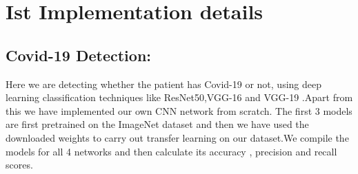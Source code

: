 \documentclass[journal]{IEEEtran}
\begin{document}
\section{Ist Implementation details}
\subsection{Covid-19 Detection:}
\label{PA:DP}
Here we are detecting whether the patient has Covid-19 or not, using deep learning classification techniques like ResNet50,VGG-16 and VGG-19 .Apart from this we have implemented our own CNN network from scratch. The first 3 models are first pretrained on the ImageNet dataset and then we have used the downloaded weights to carry out transfer learning on our dataset.We compile the models for all 4 networks and then calculate its accuracy , precision and recall scores.
\newline
\end{document}
